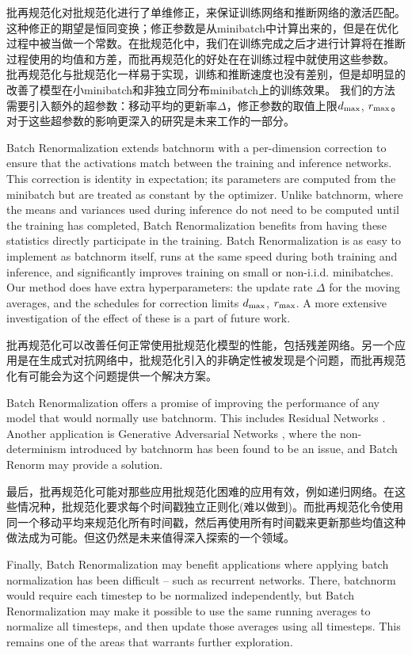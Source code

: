 批再规范化对批规范化进行了单维修正，来保证训练网络和推断网络的激活匹配。这种修正的期望是恒同变换；修正参数是从minibatch中计算出来的，但是在优化过程中被当做一个常数。在批规范化中，我们在训练完成之后才进行计算将在推断过程使用的均值和方差，而批再规范化的好处在在训练过程中就使用这些参数。
批再规范化与批规范化一样易于实现，训练和推断速度也没有差别，但是却明显的改善了模型在小minibatch和非独立同分布minibatch上的训练效果。
我们的方法需要引入额外的超参数：移动平均的更新率$\Delta$，修正参数的取值上限$d_{\text{max}}$, $r_{\text{max}}$。对于这些超参数的影响更深入的研究是未来工作的一部分。

Batch Renormalization extends batchnorm with a per-dimension correction to ensure that the activations match between the training and inference networks. This correction is identity in expectation; its parameters are computed from the minibatch but are treated as constant by the optimizer. Unlike batchnorm, where the means and variances used during inference do not need to be computed until the training has completed, Batch Renormalization benefits from having these statistics directly participate in the training. Batch Renormalization is as easy to implement as batchnorm itself, runs at the same speed during both training and inference, and significantly improves training on small or non-i.i.d. minibatches. Our method does have extra hyperparameters: the update rate $\Delta$ for the moving averages, and the schedules for correction limits $d_{\text{max}}$, $r_{\text{max}}$. A more extensive investigation of the effect of these is a part of future work.

批再规范化可以改善任何正常使用批规范化模型的性能，包括残差网络\cite{resnet}。另一个应用是在生成式对抗网络中\cite{gan}，批规范化引入的非确定性被发现是个问题，而批再规范化有可能会为这个问题提供一个解决方案。

Batch Renormalization offers a promise of improving the performance of any model that would normally use batchnorm. This includes Residual Networks \cite{resnet}. Another application is Generative Adversarial Networks \cite{gan}, where the non-determinism introduced by batchnorm has been found to be an issue, and Batch Renorm may provide a solution.

最后，批再规范化可能对那些应用批规范化困难的应用有效，例如递归网络。在这些情况种，批规范化要求每个时间戳独立正则化(难以做到)。而批再规范化令使用同一个移动平均来规范化所有时间戳，然后再使用所有时间戳来更新那些均值这种做法成为可能。但这仍然是未来值得深入探索的一个领域。

Finally, Batch Renormalization may benefit applications where applying batch normalization has been difficult -- such as recurrent networks. There, batchnorm would require each timestep to be normalized independently, but Batch Renormalization may make it possible to use the same running averages to normalize all timesteps, and then update those averages using all timesteps. This remains one of the areas that warrants further exploration.

